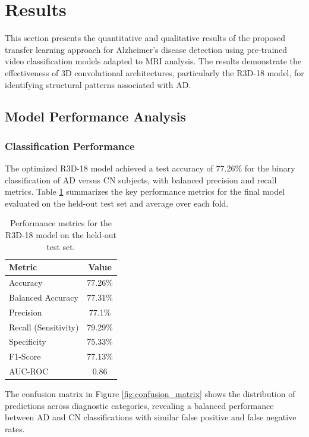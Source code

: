 \documentclass[11pt, a4paper]{article}
\begin{document}
\section{Results}
\label{sec:results}

This section presents the quantitative and qualitative results of the proposed transfer learning approach for Alzheimer's disease detection using pre-trained video classification models adapted to MRI analysis. The results demonstrate the effectiveness of 3D convolutional architectures, particularly the R3D-18 model, for identifying structural patterns associated with AD.

\subsection{Model Performance Analysis}

\subsubsection{Classification Performance}

The optimized R3D-18 model achieved a test accuracy of 77.26\% for the binary classification of AD versus CN subjects, with balanced precision and recall metrics. Table \ref{tab:performance_metrics} summarizes the key performance metrics for the final model evaluated on the held-out test set and average over each fold.

\begin{table}[htbp]
\centering
\begin{tabular}{|l|c|}
\hline
\textbf{Metric} & \textbf{Value} \\
\hline
Accuracy & 77.26\% \\
Balanced Accuracy & 77.31\% \\
Precision & 77.1\% \\
Recall (Sensitivity) & 79.29\% \\
Specificity & 75.33\% \\
F1-Score & 77.13\% \\
AUC-ROC & 0.86 \\
\hline
\end{tabular}
\caption{Performance metrics for the R3D-18 model on the held-out test set.}
\label{tab:performance_metrics}
\end{table}

The confusion matrix in Figure \ref{fig:confusion_matrix} shows the distribution of predictions across diagnostic categories, revealing a balanced performance between AD and CN classifications with similar false positive and false negative rates.
\end{document}
